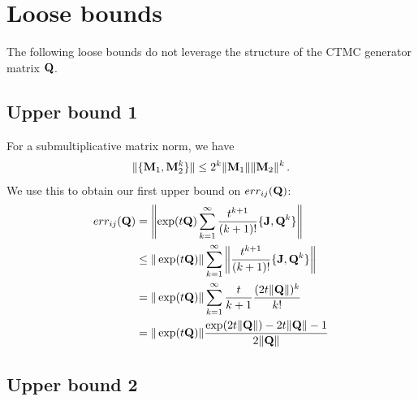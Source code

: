\documentclass[12pt]{article} %
\begin{document}
\appendix

\section{Loose bounds}\label{sec:loose}

The following loose bounds do not leverage the structure of the CTMC generator matrix $\mathbf{Q}$.

\subsection{Upper bound 1}



For a submultiplicative matrix norm, we have
\begin{align*}
	\Vert \{\mathbf{M}_1, \mathbf{M}_2^k \}  \Vert \leq 2^k \Vert \mathbf{M}_1\Vert \Vert\mathbf{M}_2 \Vert ^k \, .
\end{align*}
We use this to obtain our first upper bound on $err_{ij}(\mathbf{Q})$:
\begin{align*}
	err_{ij}(\mathbf{Q}) &= \left\Vert \exp(t\mathbf{Q})  \sum_{k=1}^\infty \frac{t^{k+1}}{(k+1)!} \{\mathbf{J},\mathbf{Q}^k\} \right\Vert  \\
	&\leq \Vert \exp(t\mathbf{Q}) \Vert \sum_{k=1}^\infty \left\Vert \frac{t^{k+1}}{(k+1)!} \{\mathbf{J},\mathbf{Q}^k\} \right\Vert  \\
	&=  \Vert \exp(t\mathbf{Q}) \Vert \sum_{k=1}^\infty \frac{t}{k+1} \frac{(2t \Vert \mathbf{Q} \Vert)^k}{k!}\\
	&= \Vert \exp(t\mathbf{Q}) \Vert   \frac{\exp(2t\Vert \mathbf{Q} \Vert)-2t\Vert\mathbf{Q}\Vert-1}{2\Vert \mathbf{Q} \Vert} 
\end{align*}


\subsection{Upper bound 2}
\end{document}
